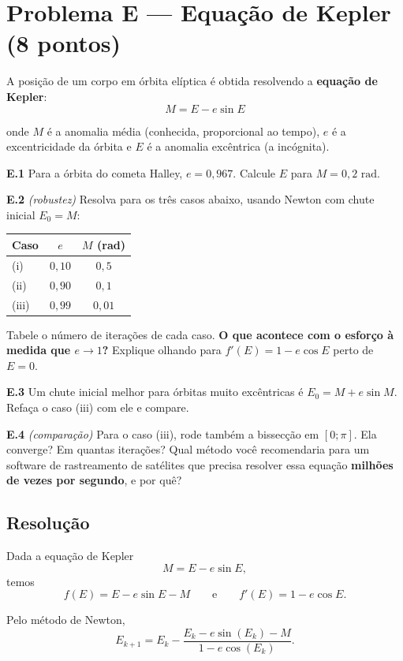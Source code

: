 \documentclass[
	12pt,				%
	openright,			%
	a4paper,			%
	english,			%
	french,				%
	spanish,			%
	brazil,				%
	]{abntex2}
\begin{document}
\section*{Problema E \textnormal{---} Equação de Kepler \textnormal{(8 pontos)}}

A posição de um corpo em órbita elíptica é obtida resolvendo a \textbf{equação de Kepler}:
\[
M = E - e \sin E
\]

onde $M$ é a anomalia média (conhecida, proporcional ao tempo), $e$ é a excentricidade da órbita e $E$ é a anomalia excêntrica (a incógnita).

\textbf{E.1} Para a órbita do cometa Halley, $e = 0,967$. Calcule $E$ para $M = 0,2\text{ rad}$.

\textbf{E.2} \textit{(robustez)} Resolva para os três casos abaixo, usando Newton com chute inicial $E_0 = M$:
\begin{center}
\begin{tabular}{lcc}
\hline
\textbf{Caso} & $e$ & \textbf{$M$ (rad)} \\ \hline
(i)   & $0,10$ & $0,5$ \\
(ii)  & $0,90$ & $0,1$ \\
(iii) & $0,99$ & $0,01$ \\ \hline
\end{tabular}
\end{center}

Tabele o número de iterações de cada caso. \textbf{O que acontece com o esforço à medida que $e \to 1$?} Explique olhando para $f'(E) = 1 - e \cos E$ perto de $E = 0$.

\textbf{E.3} Um chute inicial melhor para órbitas muito excêntricas é $E_0 = M + e \sin M$. Refaça o caso (iii) com ele e compare.

\textbf{E.4} \textit{(comparação)} Para o caso (iii), rode também a bissecção em $[0; \pi]$. Ela converge? Em quantas iterações? Qual método você recomendaria para um software de rastreamento de satélites que precisa resolver essa equação \textbf{milhões de vezes por segundo}, e por quê?

\subsection*{Resolução}

Dada a equação de Kepler
\[
M = E - e\sin E,
\]
temos
\[
f(E)=E-e\sin E-M
\qquad\text{e}\qquad
f'(E)=1-e\cos E.
\]

Pelo método de Newton,
\[
E_{k+1}
=
E_k-
\frac{E_k-e\sin(E_k)-M}
{1-e\cos(E_k)}.
\]
\end{document}
